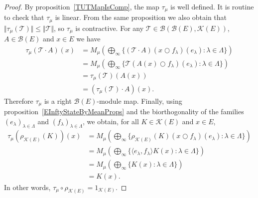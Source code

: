 \documentclass[12pt]{article}
\begin{document}
\begin{proof} By proposition~\ref{TUTMapIsComp}, the map $\tau_{\mu}$ is 
    well defined. It is routine to check that $\tau_{\mu}$ is linear. 
    From the same proposition we also obtain 
    that $\Vert \tau_{\mu}(\mathcal{T})\Vert\leq\Vert \mathcal{T}\Vert$, 
    so $\tau_{\mu}$ is contractive. For 
    any $\mathcal{T}\in\mathcal{B}(\mathcal{B}(E), \mathcal{K}(E))$, 
    $A\in\mathcal{B}(E)$ and $x\in E$ we have
    \[
        \begin{aligned}
            \tau_{\mu}(\mathcal{T}\cdot A)(x)
            &=M_{\mu}\left(
                \bigoplus\nolimits_{\infty}\{ 
                    (\mathcal{T}\cdot A)(x\bigcirc f_\lambda)(e_\lambda) : 
                    \lambda\in\Lambda 
                \}
            \right)\\
            &=M_{\mu}\left(
                \bigoplus\nolimits_{\infty}\{ 
                    \mathcal{T}(A(x)\bigcirc f_\lambda)(e_\lambda) : 
                    \lambda\in\Lambda 
                \}
            \right)\\
            &=\tau_{\mu}(\mathcal{T})(A (x))\\
            &=(\tau_{\mu}(\mathcal{T})\cdot A)(x).
        \end{aligned}
    \]
    Therefore $\tau_{\mu}$ is a right $\mathcal{B}(E)$-module map. 
    Finally, using proposition~\ref{EInftyStateByMeanProps} and the 
    biorthogonality of the families $(e_\lambda)_{\lambda\in\Lambda}$ 
    and $(f_\lambda)_{\lambda\in\Lambda}$, we obtain, for 
    all $K\in\mathcal{K}(E)$ and $x\in E$,
        \[
        \begin{aligned}
            \tau_{\mu}(\rho_{\mathcal{K}(E)}(K))(x)
            &=M_{\mu}\left(
                \bigoplus\nolimits_{\infty}\{ 
                    \rho_{\mathcal{K}(E)}(K)(x\bigcirc f_\lambda)(e_\lambda) : 
                    \lambda\in\Lambda 
                \}
            \right)\\
            &=M_{\mu}\left(
                \bigoplus\nolimits_{\infty}\{ 
                    \langle e_\lambda, f_\lambda\rangle K(x)  : 
                    \lambda\in\Lambda 
                \}
            \right)\\
            &=M_{\mu}\left(
                \bigoplus\nolimits_{\infty}\{ 
                     K(x): \lambda\in\Lambda 
                \}
            \right)\\
            &=K(x).
        \end{aligned}
    \]
    In other words, $\tau_{\mu}\circ\rho_{\mathcal{K}(E)}=1_{\mathcal{K}(E)}$.
\end{proof}
\end{document}
